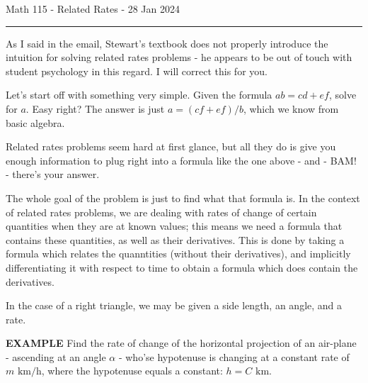 \documentclass{article}
\begin{document}
Math 115 - Related Rates - 28 Jan 2024
\hrule

\vspace{10pt}

As I said in the email, Stewart's textbook does not properly introduce the intuition for solving related rates problems - he appears to be out of touch with student psychology in this regard. I will correct this for you.

\vspace{10pt}

Let's start off with something very simple. Given the formula $ab=cd+ef$, solve for $a$. Easy right? The answer is just $a=(cf+ef)/b$, which we know from basic algebra.

\vspace{10pt}

Related rates problems seem hard at first glance, but all they do is give you enough information to plug right into a formula like the one above - and - BAM! - there's your answer. 

\vspace{10pt}

The whole goal of the problem is just to find what that formula is. In the context of related rates problems, we are dealing with rates of change of certain quantities when they are at known values;  this means we need a formula that contains these quantities, as well as their derivatives. This is done by taking a formula which relates the quanntities (without their derivatives), and implicitly differentiating it with respect to time to obtain a formula which does contain the derivatives.

\vspace{10pt}

In the case of a right triangle, we may be given a side length, an angle, and a rate. 

\vspace{10pt}

{\bf{}EXAMPLE} Find the rate of change of the horizontal projection of an air-plane - ascending at an angle $\alpha$ - who'se hypotenuse is changing at a constant rate of $m\mbox{ km/h}$, where the hypotenuse equals a constant: $h=C\mbox{ km}$.

\begin{center}
\hspace{30pt}
\end{center}
\end{document}
